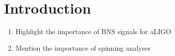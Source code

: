 \section{Introduction}

\begin{enumerate}
\item Highlight the importance of BNS signals for aLIGO
\item Mention the importance of spinning analyses
\end{enumerate}